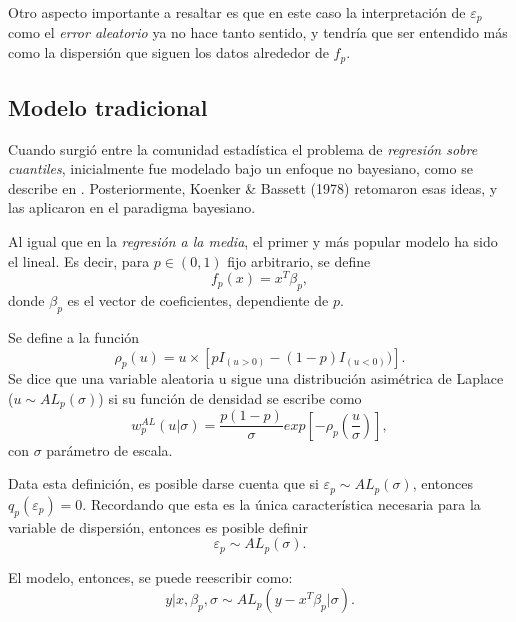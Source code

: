 Otro aspecto importante a resaltar es que en este caso la interpretaci\'on de $\varepsilon_p$ como el \textit{error aleatorio} ya no hace tanto sentido, y tendr\'ia que ser entendido m\'as como la dispersi\'on que siguen los datos alrededor de $f_p$.

\subsection{Modelo tradicional}

Cuando surgi\'o entre la comunidad estad\'istica el problema de \textit{regresi\'on sobre cuantiles}, inicialmente fue modelado bajo un enfoque no bayesiano, como se describe en \cite{Yu_BayQuantReg}.  Posteriormente, Koenker \& Bassett (1978) retomaron esas ideas, y las aplicaron en el paradigma bayesiano. 

Al igual que en la \textit{regresi\'on a la media}, el primer y m\'as popular modelo ha sido el lineal. Es decir, para $p \in (0,1)$ fijo arbitrario, se define
\begin{equation*}
    f_p(x) = x^T\beta_p, 
\end{equation*}
donde $\beta_p$ es el vector de coeficientes, dependiente de $p$.

\begin{defin}
    Se define a la funci\'on
    \begin{equation*}
        \rho_p(u) = u \times [pI_{(u>0)} - (1-p) I_{(u<0)})].
    \end{equation*}
    Se dice que una variable aleatoria u sigue una distribuci\'on asim\'etrica de Laplace ($u \sim AL_p(\sigma)$) si su funci\'on de densidad se escribe como
    \begin{equation*}
        w_p^{AL}(u|\sigma) = 
        \frac{p(1-p)}{\sigma}
        exp\left[
        -\rho_p
        \left(
        \frac{u}{\sigma}
        \right)
        \right],
    \end{equation*}
con $\sigma$ par\'ametro de escala.
\end{defin}

Data esta definici\'on, es posible darse cuenta que si $\varepsilon_p \sim AL_p(\sigma)$, entonces $q_p(\varepsilon_p) = 0$. Recordando que esta es la \'unica caracter\'istica necesaria para la variable de dispersi\'on, entonces es posible definir
\begin{equation*}
    \varepsilon_p \sim AL_p(\sigma).
\end{equation*}

El modelo, entonces, se puede reescribir como:
\begin{equation*}
    y | x, \beta_p, \sigma 
    \sim 
    AL_p(y - x^T\beta_p|\sigma).
\end{equation*}

